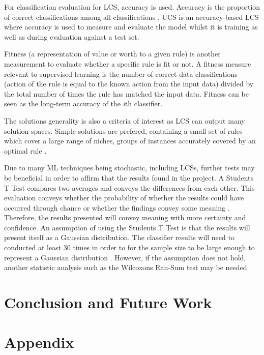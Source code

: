 For classification evaluation for LCS, accuracy is used. Accuracy is the proportion of correct classifications among all classifications \cite{urbanowicz2017introduction}. UCS is an accuracy-based LCS where accuracy is used to measure and evaluate the model whilst it is training as well as during evaluation against a test set.

Fitness (a representation of value or worth to a given rule)\cite{urbanowicz2017introduction} is another measurement to evaluate whether a specific rule is fit or not. A fitness measure relevant to supervised learning is the number of correct data classifications (action of the rule is equal to the known action from the input data) divided by the total number of times the rule has matched the input data. Fitness can be seen as the long-term accuracy of the \textit{i}th classifier.

The solution\textquotesingle s generality is also a criteria of interest as LCS can output many solution spaces. Simple solutions are prefered, containing a small set of rules which cover a large range of niches, groups of instances accurately covered by an optimal rule \cite{urbanowicz2017introduction}. 

Due to many ML techniques being stochastic, including LCSs, further tests may be beneficial in order to affirm that the results found in the project. A Student\textquotesingle s T Test compares two averages and conveys the differences from each other. This evaluation conveys whether the probability of whether the results could have occurred through chance or whether the findings convey some meaning \cite{blair1980comparison}. Therefore, the results presented will convey meaning with more certainty and confidence. An assumption of using the Student\textquotesingle s T Test is that the results will present itself as a Gaussian distribution. The classifier results will need to conducted at least 30 times in order to for the sample size to be large enough to represent a Gaussian distribution \cite{blair1980comparison}. However, if the assumption does not hold, another statistic analysis such as the Wilcoxon\textquotesingle s Ran-Sum test \cite{wilcoxon1950some} may be needed.


\chapter{Conclusion and Future Work}

\chapter{Appendix}
